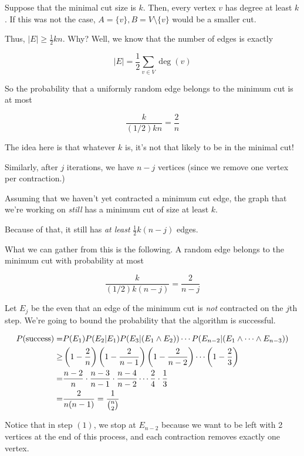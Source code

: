\documentclass[12pt]{article}
\begin{document}
  {
    Suppose that the minimal cut size is $k$. Then, every vertex $v$ has degree
    at least $k$. If this was not the case, $A = \{v\}, B = V \setminus \{v\}$ would be a
    smaller cut.

    Thus, $|E| \ge \frac{1}{2} kn$. Why? Well, we know that the number of edges is exactly

    \[
      |E| = \frac{1}{2} \sum_{v \in V} \deg(v)
    \]

    So the probability that a uniformly random edge belongs to the minimum cut
    is at most

    \[
      \frac{k}{(1 / 2) kn} = \frac{2}{n}
    \]

    The idea here is that whatever $k$ is, it's not that likely to be in the
    minimal cut!

    Similarly, after $j$ iterations, we have $n - j$ vertices (since we remove
    one vertex per contraction.)

    Assuming that we haven't yet contracted a minimum cut edge, the graph that
    we're working on {\it still} has a minimum cut of size at least $k$.

    Because of that, it still has {\it at least} $\frac{1}{2} k (n - j)$ edges.

    What we can gather from this is the following. A random edge belongs to the
    minimum cut with probability at most

    \[
      \frac{k}{(1 / 2) k (n - j)} = \frac{2}{n - j}
    \]

    Let $E_j$ be the even that an edge of the minimum cut is {\it not}
    contracted on the $j$th step. We're going to bound the probability that the
    algorithm is successful.

    \begin{align}
      P(\text{success}) =&P(E_1) P(E_2 | E_1) P(E_3 | (E_1 \wedge E_2)) \cdots P(E_{n - 2} | (E_1 \wedge \cdots \wedge E_{n - 3})) \\
      \ge& \left(1 - \frac{2}{n}\right)\left(1 - \frac{2}{n - 1}\right)\left(1 -
      \frac{2}{n - 2}\right) \cdots \left(1 - \frac{2}{3}\right) \notag\\
      =&\frac{n - 2}{n} \cdot \frac{n - 3}{n - 1} \cdot \frac{n - 4}{n - 2}
      \cdots \frac{2}{4} \cdot \frac{1}{3} \notag\\
      =&\frac{2}{n(n - 1)} = \frac{1}{\binom{n}{2}} \notag
    \end{align}

    Notice that in step $(1)$, we stop at $E_{n - 2}$ because we want to be left
    with 2 vertices at the end of this process, and each contraction removes
    exactly one vertex.
  }
\end{document}
